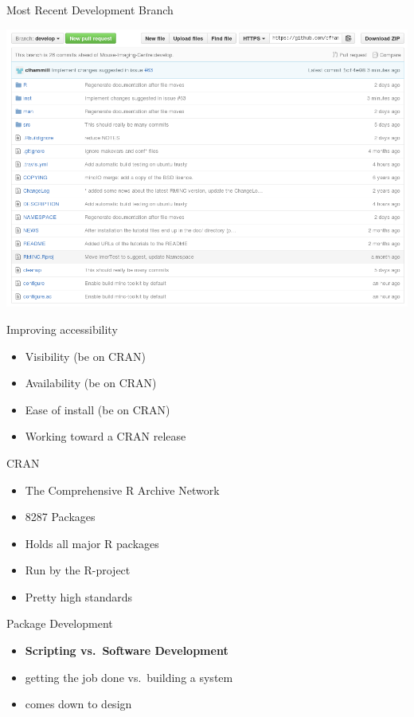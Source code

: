 \begin{frame}{Most Recent Development Branch}

\includegraphics{RMINC_recent_dev.png}

\end{frame}

\begin{frame}{Improving accessibility}

\begin{itemize}[<+->]
\tightlist
\item
  Visibility (be on CRAN)
\item
  Availability (be on CRAN)
\item
  Ease of install (be on CRAN)
\item
  Working toward a CRAN release
\end{itemize}

\end{frame}

\begin{frame}{CRAN}

\begin{itemize}
\tightlist
\item
  The Comprehensive R Archive Network
\item
  8287 Packages
\item
  Holds all major R packages
\item
  Run by the R-project
\item
  Pretty high standards
\end{itemize}

\end{frame}

\begin{frame}{Package Development}

\begin{itemize}[<+->]
\tightlist
\item
  \textbf{Scripting vs.~Software Development}
\item
  getting the job done vs.~building a system
\item
  comes down to design
\end{itemize}

\end{frame}

